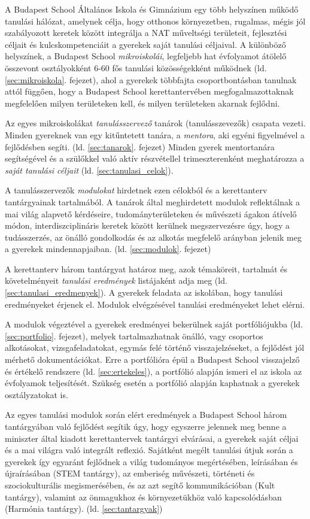 A Budapest School Általános Iskola és Gimnázium egy több helyszínen működő
tanulási hálózat, amelynek célja, hogy otthonos környezetben, rugalmas, mégis
jól szabályozott keretek között integrálja a NAT
műveltségi
területeit, fejlesztési céljait és kulcskompetenciáit a gyerekek saját tanulási céljaival. A különböző helyszínek, a Budapest
School \emph{mikroiskolái}, legfeljebb hat évfolyamot átölelő összevont
osztályokként
6-60 fős tanulási közösségekként működnek (ld. \ref{sec:mikroiskola}. fejezet),
ahol a gyerekek többfajta
csoportbontásban tanulnak attól függően, hogy a Budapest School
kerettantervében megfogalmazottaknak megfelelően milyen területeken kell, és
milyen területeken akarnak fejlődni.

Az egyes mikroiskolákat \emph{tanulásszervező} tanárok (tanulásszevezők)
csapata
vezeti.
Minden gyereknek van egy kitűntetett tanára, a \emph{mentora},
aki egyéni figyelmével a fejlődésben segíti.
(ld. \ref{sec:tanarok}. fejezet)
Minden gyerek mentortanára segítségével és a szülőkkel való aktív
részvétellel trimeszterenként meghatározza a \emph{saját tanulási céljait} (ld.
\ref{sec:tanulasi_celok}).

A tanulásszervezők \emph{modulokat} hirdetnek ezen célokból és a kerettanterv
tantárgyainak tartalmából. A tanárok által meghirdetett modulok reflektálnak a
mai világ alapvető kérdéseire, tudományterületeken és művészeti ágakon átívelő
módon, interdiszciplináris keretek között kerülnek megszervezésre úgy, hogy a
tudásszerzés, az önálló gondolkodás és az alkotás megfelelő arányban jelenik
meg a gyerekek mindennapjaiban. (ld. \ref{sec:modulok}. fejezet)

A kerettanterv három tantárgyat határoz meg, azok
témaköreit, tartalmát és követelményeit \emph{tanulási eredmények}
listájaként adja meg (ld. \ref{sec:tanulasi_eredmenyek}). A gyerekek feladata
az iskolában, hogy tanulási eredményeket
érjenek el. Modulok elvégzésével tanulási eredményeket lehet
elérni.

A modulok végeztével a gyerekek eredményei bekerülnek saját portfóliójukba (ld.
\ref{sec:portfolio}. fejezet),
melyek tartalmazhatnak önálló, vagy csoportos alkotásokat, vizsgafeladatokat,
egymás felé történő visszajelzéseket, a fejlődést jól mérhető dokumentációkat.
Erre a portfólióra épül a Budapest School visszajelző és értékelő rendszere (ld. \ref{sec:ertekeles}), a
portfólió alapján ismeri el az iskola az évfolyamok teljesítését. Szükség
esetén a portfólió alapján kaphatnak a gyerekek osztályzatokat is.

Az egyes
tanulási modulok során elért eredmények a Budapest School három tantárgyában
való fejlődést segítik úgy, hogy egyszerre jelennek meg benne a miniszter által
kiadott kerettantervek tantárgyi elvárásai, a gyerekek saját céljai és a mai
világra való integrált reflexió. Sajátként megélt tanulási útjuk során a
gyerekek így egyaránt fejlődnek a világ tudományos megértésében, leírásában és
újraírásában (STEM tantárgy), az emberiség művészeti, történeti és
szociokulturális
megismerésében, és az azt segítő kommunikációban (Kult tantárgy), valamint az
önmagukhoz
és környezetükhöz való kapcsolódásban (Harmónia tantárgy). (ld.
\ref{sec:tantargyak})




\ifkerettanterv
  
\fi
